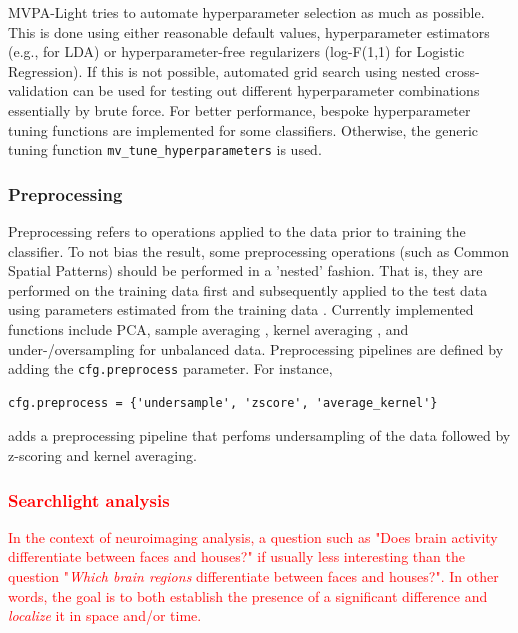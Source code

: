 \documentclass[utf8]{frontiersSCNS} %
\newcommand{\ttt}[1]{\texttt{#1}}
\newcommand{\red}[1]{\textcolor{red}{#1}}
\begin{document}
MVPA-Light tries to automate hyperparameter selection as much as possible. This is done using either reasonable default values, hyperparameter estimators (e.g., \cite{Ledoit2003HoneyMatrix} for LDA) or  hyperparameter-free regularizers (log-F(1,1) for Logistic Regression). If this is not possible, automated grid search using nested cross-validation can be used for testing out different hyperparameter combinations essentially by brute force. For better performance, bespoke hyperparameter tuning functions are implemented for some classifiers. Otherwise, the generic tuning function \ttt{mv\_tune\_hyperparameters} is used.

\subsubsection{Preprocessing}\label{sec:preprocessing}

Preprocessing refers to operations applied to the data prior to training the classifier. To not bias the result, some preprocessing operations (such as Common Spatial Patterns) should be performed in a 'nested' fashion. That is, they are performed on the training data first and subsequently applied to the test data using parameters estimated from the training data \citep{Lemm2011,Varoquaux2017}. 
Currently implemented functions include PCA, sample averaging \citep{Cichy2017MultivariateSpace}, kernel averaging \citep{Treder2018}, and under-/oversampling for unbalanced data. Preprocessing pipelines are defined by adding the \ttt{cfg.preprocess} parameter. For instance,

\begin{verbatim}
cfg.preprocess = {'undersample', 'zscore', 'average_kernel'}
\end{verbatim}

adds a preprocessing pipeline that perfoms undersampling of the data followed by z-scoring and kernel averaging.

\subsubsection{\red{Searchlight analysis}}\label{sec:searchlight}

\red{In the context of neuroimaging analysis, a question such as "Does brain activity differentiate between faces and houses?" if usually less interesting than the question "\textit{Which brain regions} differentiate between faces and houses?". In other words, the goal is to both establish the presence of a significant difference and  \textit{localize} it in space and/or time.}
\end{document}
